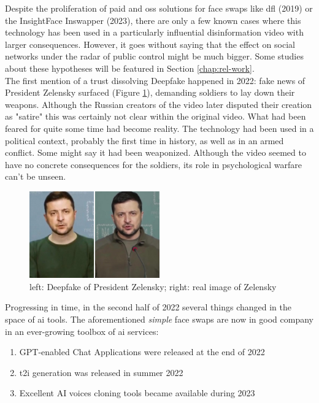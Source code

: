 \documentclass[
  a4paper,  %
  twoside,  %
  bibliography=totoc,
  headsepline,
  cleardoublepage=empty,
  parskip=half,
  draft=false
]{scrbook}
\begin{document}
Despite the proliferation of paid and \gls{oss} solutions for face swaps like \gls{dfl} (2019) or the InsightFace Inswapper (2023), there are only a few known cases where this technology has been used in a particularly influential disinformation video with larger consequences. However, it goes without saying that the effect on social networks under the radar of public control might be much bigger. Some studies about these hypotheses will be featured in Section \ref{chap:rel-work}. \\
The first mention of a trust dissolving Deepfake happened in 2022: fake news of President Zelensky surfaced (Figure \ref{fig:zelensky-Deepfake}), demanding soldiers to lay down their weapons. Although the Russian creators of the video later disputed their creation as "satire" this was certainly not clear within the original video. What had been feared for quite some time had become reality. The technology had been used in a political context, probably the first time in history, as well as in an armed conflict. Some might say it had been weaponized. Although the video seemed to have no concrete consequences for the soldiers, its role in psychological warfare can't be unseen.
\begin{figure}[h]
  \centering
  \includegraphics[width=0.5\textwidth]{./graphics/images/Zelensky.jpg}
  \caption{left: Deepfake of President Zelensky; right: real image of Zelensky \cite{universityofvirginiaZelenskyySurrenderHoax2022}}
  \label{fig:zelensky-Deepfake}
\end{figure}
Progressing in time, in the second half of 2022 several things changed in the space of \gls{ai} tools. The aforementioned \textit{simple} face swaps are now in good company in an ever-growing toolbox of \gls{ai} services: 
\begin{enumerate}
  \item GPT-enabled Chat Applications were released at the end of 2022
  \item \gls{t2i} generation was released in summer 2022
  \item Excellent AI voices cloning tools became available during 2023
\end{enumerate}
\end{document}
